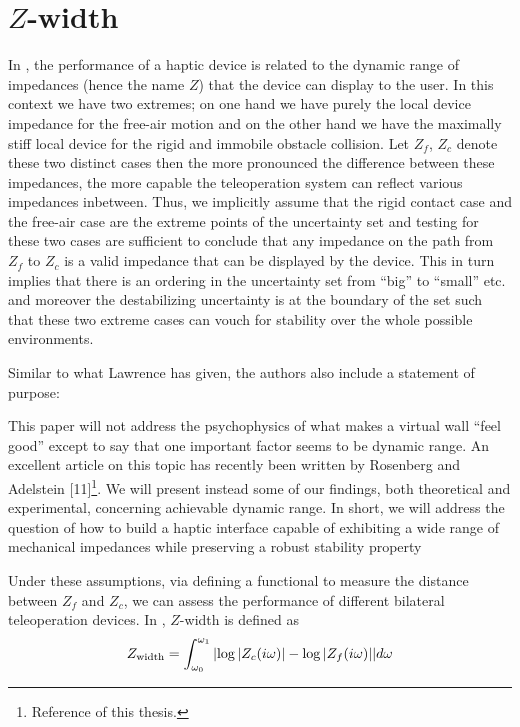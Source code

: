 \section{\texorpdfstring{$Z$}{Z}-width}

In \cite{colgate4}, the performance of a haptic device is related to the dynamic range of impedances (hence the name $Z$) that
the device can display to the user. In this context we have two extremes; on one hand we have purely the local device impedance 
for the free-air motion and on the other hand we have the maximally stiff local device for the rigid and immobile obstacle collision. 
Let $Z_f$, $Z_c$ denote these two distinct cases then the more pronounced the difference between these impedances, the more 
capable the teleoperation system can reflect various impedances inbetween. Thus, we implicitly assume that the rigid contact 
case and the free-air case are the extreme points of the uncertainty set and testing for these two cases are sufficient to 
conclude that any impedance on the path from $Z_f$ to $Z_c$ is a valid impedance that can be displayed by the device. This
in turn implies that there is an ordering in the uncertainty set from \enquote{big} to \enquote{small} etc. and moreover 
the destabilizing uncertainty is at the boundary of the set such that these two extreme cases can vouch for stability over 
the whole possible environments.

Similar to what Lawrence has given, the authors also include a statement of purpose: 

\begin{displayquote}
This paper will not address the psychophysics of what
makes a virtual wall \enquote{feel good} except to say that one
important factor seems to be dynamic range. An excellent
article on this topic has recently been written by
Rosenberg and Adelstein [11]\footnote{Reference \cite{rosenberg} of this thesis.}. 
We will present instead
some of our findings, both theoretical and experimental,
concerning achievable dynamic range. In short, we will
address the question of how to build a haptic interface
capable of exhibiting a wide range of mechanical
impedances while preserving a robust stability property
\end{displayquote}


Under these assumptions, via defining a functional to measure the distance between $Z_f$ and $Z_c$, we can assess the performance
of different bilateral teleoperation devices. In \cite{goranthesis}, $Z$-width is defined as 
\begin{equation}
Z_{\text{width}} = \int_{\omega_0}^{\omega_1}{\displaystyle \left|\log|Z_{\vphantom{f}c}(i\omega)|-\log |Z_f(i\omega)|\right|}d\omega
\label{eq:zwidth}
\end{equation}

